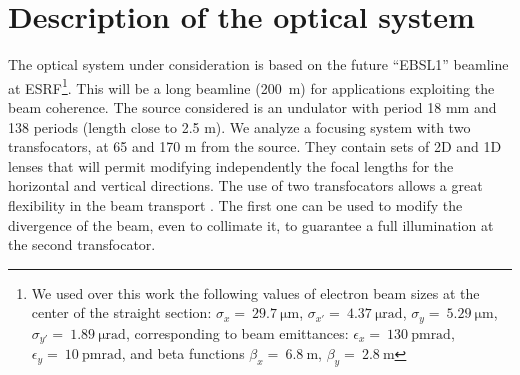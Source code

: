 \documentclass{iucr}              %
\begin{document}
\section{Description of the optical system}
\label{sec:beamline}

The optical system under consideration is based on the future ``EBSL1'' beamline at ESRF\footnote{We used over this work the following values of electron beam sizes at the center of the straight section: $\sigma_x=~\SI{29.7}{\micro\meter}$,
$\sigma_{x'}=~\SI{4.37}{\micro\radian}$,
$\sigma_y=~\SI{5.29}{\micro\meter}$,
$\sigma_{y'}=~\SI{1.89}{\micro\radian}$, corresponding to beam emittances:  $\epsilon_x=~\SI{130}{\pico\meter \radian}$,
$\epsilon_y=~\SI{10}{\pico\meter \radian}$, and beta functions
$\beta_x=~\SI{6.8}{\meter}$,
$\beta_y=~\SI{2.8}{\meter}$
}. This will be a long beamline (\SI{200}{\meter}) for applications exploiting the beam coherence. The source considered is an undulator with period 18 mm and 138 periods (length close to 2.5 m).  
We analyze a focusing system with two transfocators, at 65 and 170 m from the source. They contain sets of 2D and 1D lenses that will permit modifying independently the focal lengths for the horizontal and vertical directions. The use of two transfocators allows a great flexibility in the beam transport \cite{Vaughan:kv5084}. The first one can be used to modify the divergence of the beam, even to collimate it, to guarantee a full illumination at the second transfocator.  
\end{document}
